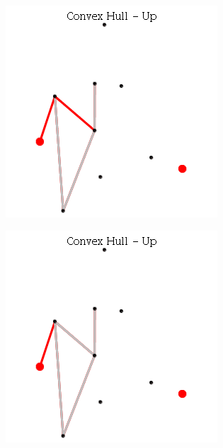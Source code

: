 \documentclass[12pt]{article}
\begin{document}
\begin{figure}[h]
\begin{subfigure}[h]{0.3\linewidth}
              \caption{}
            \end{subfigure}
            \begin{subfigure}[h]{0.3\linewidth}
              \includegraphics[width=\linewidth]{GIF/Up-8}
              \caption{}
            \end{subfigure}
            \begin{subfigure}[h]{0.3\linewidth}
              \includegraphics[width=\linewidth]{GIF/Up-9}

\end{subfigure}
\end{figure}
\end{document}
